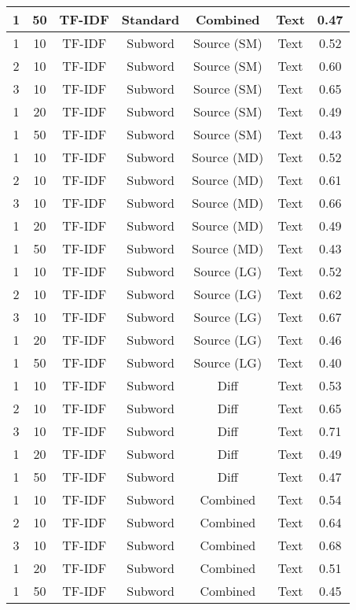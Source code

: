 \begin{longtable}{|c|c|c|c|c|c|c|}
\hline
1 & 50 & TF-IDF & Standard & Combined & Text & 0.47 \\
\hline
1 & 10 & TF-IDF & Subword & Source (SM) & Text & 0.52 \\
\hline
2 & 10 & TF-IDF & Subword & Source (SM) & Text & 0.60 \\
\hline
3 & 10 & TF-IDF & Subword & Source (SM) & Text & 0.65 \\
\hline
1 & 20 & TF-IDF & Subword & Source (SM) & Text & 0.49 \\
\hline
1 & 50 & TF-IDF & Subword & Source (SM) & Text & 0.43 \\
\hline
1 & 10 & TF-IDF & Subword & Source (MD) & Text & 0.52 \\
\hline
2 & 10 & TF-IDF & Subword & Source (MD) & Text & 0.61 \\
\hline
3 & 10 & TF-IDF & Subword & Source (MD) & Text & 0.66 \\
\hline
1 & 20 & TF-IDF & Subword & Source (MD) & Text & 0.49 \\
\hline
1 & 50 & TF-IDF & Subword & Source (MD) & Text & 0.43 \\
\hline
1 & 10 & TF-IDF & Subword & Source (LG) & Text & 0.52 \\
\hline
2 & 10 & TF-IDF & Subword & Source (LG) & Text & 0.62 \\
\hline
3 & 10 & TF-IDF & Subword & Source (LG) & Text & 0.67 \\
\hline
1 & 20 & TF-IDF & Subword & Source (LG) & Text & 0.46 \\
\hline
1 & 50 & TF-IDF & Subword & Source (LG) & Text & 0.40 \\
\hline
1 & 10 & TF-IDF & Subword & Diff & Text & 0.53 \\
\hline
2 & 10 & TF-IDF & Subword & Diff & Text & 0.65 \\
\hline
3 & 10 & TF-IDF & Subword & Diff & Text & 0.71 \\
\hline
1 & 20 & TF-IDF & Subword & Diff & Text & 0.49 \\
\hline
1 & 50 & TF-IDF & Subword & Diff & Text & 0.47 \\
\hline
1 & 10 & TF-IDF & Subword & Combined & Text & 0.54 \\
\hline
2 & 10 & TF-IDF & Subword & Combined & Text & 0.64 \\
\hline
3 & 10 & TF-IDF & Subword & Combined & Text & 0.68 \\
\hline
1 & 20 & TF-IDF & Subword & Combined & Text & 0.51 \\
\hline
1 & 50 & TF-IDF & Subword & Combined & Text & 0.45 \\

\end{longtable}
